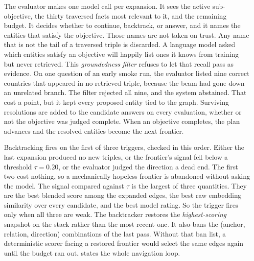 The evaluator makes one model call per expansion. It sees the active
sub-objective, the thirty traversed facts most relevant to it, and the remaining
budget. It decides whether to continue, backtrack, or answer, and it names the
entities that satisfy the objective. Those names are not taken on trust. Any
name that is not the tail of a traversed triple is discarded. A language model
asked which entities satisfy an objective will happily list ones it knows from
training but never retrieved. This \emph{groundedness filter} refuses to let
that recall pass as evidence. On one question of an early smoke run, the
evaluator listed nine correct countries that appeared in no retrieved triple,
because the beam had gone down an unrelated branch. The filter rejected all
nine, and the system abstained. That cost a point, but it kept every proposed
entity tied to the graph. Surviving resolutions are added to the candidate
answers on every evaluation, whether or not the objective was judged complete.
When an objective completes, the plan advances and the resolved entities become
the next frontier.

Backtracking fires on the first of three triggers, checked in this order. Either
the last expansion produced no new triples, or the frontier's signal fell below
a threshold $\tau = 0.20$, or the evaluator judged the direction a dead end. The
first two cost nothing, so a mechanically hopeless frontier is abandoned without
asking the model. The signal compared against $\tau$ is the largest of three
quantities. They are the best blended score among the expanded edges, the best
raw embedding similarity over every candidate, and the best model rating. So the
trigger fires only when all three are weak. The backtracker restores the
\emph{highest-scoring} snapshot on the stack rather than the most recent one. It
also bans the (anchor, relation, direction) combinations of the last pass.
Without that ban list, a deterministic scorer facing a restored frontier would
select the same edges again until the budget ran out.  states the
whole navigation loop.

